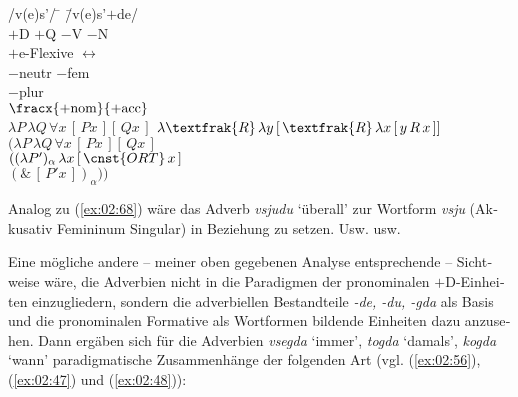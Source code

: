 \documentclass[output=paper, colorlinks, citecolor=brown, booklanguage=german]{langscibook}
\begin{document}
\begin{otherlanguage}{german}
\ea\label{ex:02:68}
\begin{tabbing}
/v(e)s'/  \hspace{2cm}                                    \=  \hspace{1cm}               \= /v(e)s'$+$de/                                                        \\
$+$D $+$Q                                     \>                   \> $-$V $-$N                                                            \\
$+$e-Flexive                                  \> $\leftrightarrow$ \>                                                                      \\
$-$neutr $-$fem                               \>                   \>                                                                      \\
$-$plur                                       \>                   \>                                                                      \\
$\fracx{+\textrm{nom}}{+\textrm{acc}}$        \>                   \>                                                                      \\
$\lambda P\, \lambda Q\, \forall x\, [\, P x \,][\, Q x \,]$ \>                   \> $\lambda \textfrak{R}\, \lambda y\, [\, \textfrak{R}\, \lambda x\, [\, y\, R\, x \,]]$ \\
                                              \>                   \> $(\lambda P\, \lambda Q\, \forall x\, [\, P x \,] [\, Q x \,] $                    \\
                                              \>                   \> $((\lambda P')_\alpha\, \lambda x\, [\, \cnst{ORT}\, x \,]$                  \\
                                              \>                   \> $(\&\, [\, P'x \,])_\alpha )) $                                             
\end{tabbing}
\z 

\noindent Analog zu (\ref{ex:02:68}) wäre das Adverb \textit{vsjudu} `überall' zur Wortform \textit{vsju} (Akkusativ Femininum Singular) in Beziehung zu setzen. Usw. usw.

\largerpage
Eine mögliche andere -- meiner oben gegebenen Analyse entsprechende -- Sicht\-wei\-se wäre, die Adverbien nicht in die Paradigmen der pronominalen $+$D-Ein\-hei\-ten einzugliedern, sondern die adverbiellen Bestandteile \textit{-de, -du, -gda} als Basis und die pronominalen Formative als Wortformen bildende Einheiten dazu anzusehen. Dann ergäben sich für die Adverbien \textit{vsegda} `immer', \textit{togda} `damals', \textit{kogda} `wann' paradigmatische Zusammenhänge der folgenden Art (vgl. (\ref{ex:02:56}), (\ref{ex:02:47}) und (\ref{ex:02:48})):\enlargethispage{-1\baselineskip}


\end{otherlanguage}
\end{document}
